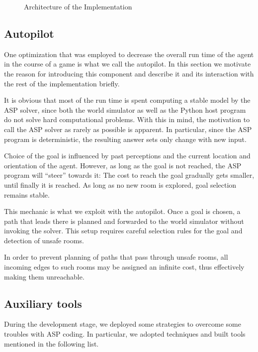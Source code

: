 \documentclass{llncs}
\begin{document}
\begin{figure}
\begin{center}

\end{center}
\caption{Architecture of the Implementation}
\label{fig:architecture}
\end{figure}

\subsection{Autopilot}

One optimization that was employed to decrease the overall run time of the agent in the course of a game is what we call the autopilot. In this section we motivate the reason for introducing this component and describe it and its interaction with the rest of the implementation briefly.

It is obvious that most of the run time is spent computing a stable model by the ASP solver, since both the world simulator as well as the Python host program do not solve hard computational problems. With this in mind, the motivation to call the ASP solver as rarely as possible is apparent. In particular, since the ASP program is deterministic, the resulting answer sets only change with new input.

Choice of the goal is influenced by past perceptions and the current location and orientation of the agent. However, as long as the goal is not reached, the ASP program will \enquote{steer} towards it: The cost to reach the goal gradually gets smaller, until finally it is reached. As long as no new room is explored, goal selection remains stable.

This mechanic is what we exploit with the autopilot. Once a goal is chosen, a path that leads there is planned and forwarded to the world simulator without invoking the solver. This setup requires careful selection rules for the goal and detection of unsafe rooms.

In order to prevent planning of paths that pass through unsafe rooms, all incoming edges to such rooms may be assigned an infinite cost, thus effectively making them unreachable.


\subsection{Auxiliary tools}

During the development stage, we deployed some strategies to overcome some troubles with ASP coding. In particular, we adopted techniques and built tools mentioned in the following list.
\end{document}
